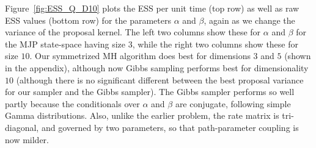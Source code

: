 Figure~\ref{fig:ESS_Q_D10} plots the ESS per unit time (top row) as well as raw ESS values (bottom row) for the parameters $\alpha$ and $\beta$, again as we change the variance of the proposal kernel. 
The left two columns show these for $\alpha$ and $\beta$ for the MJP state-space having size $3$, while the right two columns show these for size $10$.
Our symmetrized  MH algorithm does best for dimensions $3$ and $5$ (shown in the appendix), although now Gibbs sampling performs best for dimensionality $10$ (although there is no significant different between the best proposal variance for our sampler and the Gibbs sampler).
The Gibbs sampler performs so well partly because the conditionals over $\alpha$ and $\beta$ are conjugate, following simple Gamma distributions. Also, unlike the earlier problem, the rate matrix is tri-diagonal, and governed by two parameters, so that path-parameter coupling is now milder.
